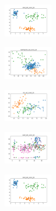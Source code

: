 \begin{figure}[H]
    \begin{subfigure}
        \centering
        \includegraphics[width=0.234\textwidth]{img/copkm/rand_set_const_20_277451237_clust.png}
    \end{subfigure}
    \hfill
    \begin{subfigure}
        \centering
        \includegraphics[width=0.234\textwidth]{img/copkm/newthyroid_set_const_20_277451237_clust.png}
    \end{subfigure}
    \hfill
    \begin{subfigure}
        \centering
        \includegraphics[width=0.234\textwidth]{img/copkm/iris_set_const_20_49258669_clust.png}
    \end{subfigure}
    \hfill
    \begin{subfigure}
        \centering
        \includegraphics[width=0.234\textwidth]{img/copkm/ecoli_set_const_20_49258669_clust.png}
    \end{subfigure}
    \hfill
    \begin{subfigure}
        \centering
        \includegraphics[width=0.234\textwidth]{img/copkm/rand_set_const_20_49258669_clust.png}
    \end{subfigure}
    \hfill
    \begin{subfigure}
        \centering

\end{subfigure}
\end{figure}
